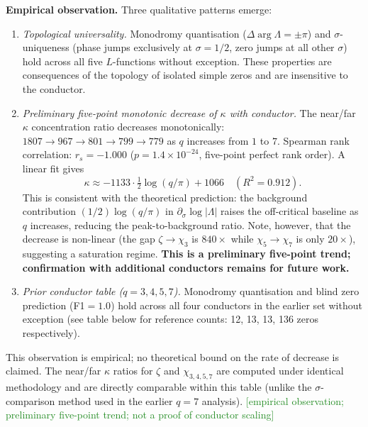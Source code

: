\documentclass[11pt, a4paper]{article}
\theoremstyle{definition}
\theoremstyle{plain}
\begin{document}
\medskip\noindent
\textbf{Empirical observation.}
Three qualitative patterns emerge:
\begin{enumerate}
  \item \emph{Topological universality.}
        Monodromy quantisation ($\Delta\arg\Lambda = \pm\pi$) and
        $\sigma$-uniqueness (phase jumps exclusively at $\sigma=1/2$,
        zero jumps at all other $\sigma$) hold across all five $L$-functions
        without exception.
        These properties are consequences of the topology of isolated simple
        zeros and are insensitive to the conductor.

  \item \emph{Preliminary five-point monotonic decrease of $\kappa$ with conductor.}
        The near/far $\kappa$ concentration ratio decreases monotonically:
        $1807 \to 967 \to 801 \to 799 \to 779$ as $q$ increases from $1$ to $7$.
        Spearman rank correlation: $r_s = -1.000$ ($p = 1.4\times10^{-24}$,
        five-point perfect rank order).
        A linear fit gives
        \[
          \kappa \approx -1133 \cdot \tfrac{1}{2}\log(q/\pi) + 1066
          \quad (R^2 = 0.912).
        \]
        This is consistent with the theoretical prediction: the background
        contribution $(1/2)\log(q/\pi)$ in $\partial_\sigma\log|\Lambda|$
        raises the off-critical baseline as $q$ increases, reducing the
        peak-to-background ratio.
        Note, however, that the decrease is non-linear (the gap
        $\zeta\to\chi_3$ is $840\times$ while $\chi_5\to\chi_7$ is only
        $20\times$), suggesting a saturation regime.
        \textbf{This is a preliminary five-point trend; confirmation with
        additional conductors remains for future work.}

  \item \emph{Prior conductor table ($q=3,4,5,7$).}
        Monodromy quantisation and blind zero prediction (F1$=1.0$) hold
        across all four conductors in the earlier set without exception (see
        table below for reference counts: 12, 13, 13, 136 zeros respectively).
\end{enumerate}

\noindent
This observation is empirical; no theoretical bound on the rate of decrease
is claimed.  The near/far $\kappa$ ratios for $\zeta$ and $\chi_{3,4,5,7}$
are computed under identical methodology and are directly comparable
within this table (unlike the $\sigma$-comparison method used in the
earlier $q=7$ analysis).
\textcolor{ForestGreen}{[empirical observation; preliminary five-point trend; not a proof of conductor scaling]}
\end{document}
